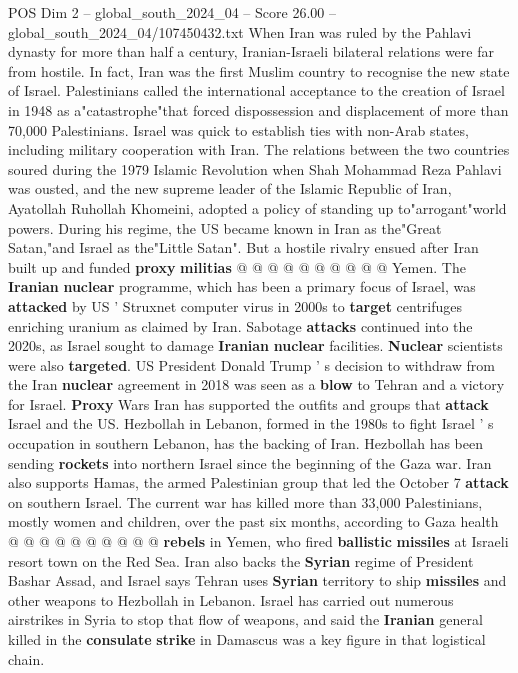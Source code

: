 \begin{textsample}{POS Dim 2 – global\_south\_2024\_04 – Score 26.00 – global\_south\_2024\_04/107450432.txt}
When Iran was ruled by the Pahlavi dynasty for more than half a century, Iranian-Israeli bilateral relations were far from hostile.
In fact, Iran was the first Muslim country to recognise the new state of Israel.
Palestinians called the international acceptance to the creation of Israel in 1948 as a"catastrophe"that forced dispossession and displacement of more than 70,000 Palestinians.
Israel was quick to establish ties with non-Arab states, including military cooperation with Iran.
The relations between the two countries soured during the 1979 Islamic Revolution when Shah Mohammad Reza Pahlavi was ousted, and the new supreme leader of the Islamic Republic of Iran, Ayatollah Ruhollah Khomeini, adopted a policy of standing up to"arrogant"world powers.
During his regime, the US became known in Iran as the"Great Satan,"and Israel as the"Little Satan".
But a hostile rivalry ensued after Iran built up and funded \textbf{proxy} \textbf{militias} @ @ @ @ @ @ @ @ @ @ Yemen.
The \textbf{Iranian} \textbf{nuclear} programme, which has been a primary focus of Israel, was \textbf{attacked} by US ' Struxnet computer virus in 2000s to \textbf{target} centrifuges enriching uranium as claimed by Iran.
Sabotage \textbf{attacks} continued into the 2020s, as Israel sought to damage \textbf{Iranian} \textbf{nuclear} facilities. \textbf{Nuclear} scientists were also \textbf{targeted}.
US President Donald Trump ' s decision to withdraw from the Iran \textbf{nuclear} agreement in 2018 was seen as a \textbf{blow} to Tehran and a victory for Israel. \textbf{Proxy} Wars Iran has supported the outfits and groups that \textbf{attack} Israel and the US.
Hezbollah in Lebanon, formed in the 1980s to fight Israel ' s occupation in southern Lebanon, has the backing of Iran.
Hezbollah has been sending \textbf{rockets} into northern Israel since the beginning of the Gaza war.
Iran also supports Hamas, the armed Palestinian group that led the October 7 \textbf{attack} on southern Israel.
The current war has killed more than 33,000 Palestinians, mostly women and children, over the past six months, according to Gaza health @ @ @ @ @ @ @ @ @ @ \textbf{rebels} in Yemen, who fired \textbf{ballistic} \textbf{missiles} at Israeli resort town on the Red Sea.
Iran also backs the \textbf{Syrian} regime of President Bashar Assad, and Israel says Tehran uses \textbf{Syrian} territory to ship \textbf{missiles} and other weapons to Hezbollah in Lebanon.
Israel has carried out numerous airstrikes in Syria to stop that flow of weapons, and said the \textbf{Iranian} general killed in the \textbf{consulate} \textbf{strike} in Damascus was a key figure in that logistical chain.

\end{textsample}
